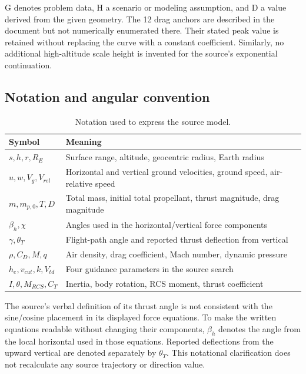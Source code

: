 \documentclass[11pt,a4paper]{article}
\begin{document}


G denotes problem data, H a scenario or modeling assumption, and D a value derived from the given geometry. The 12 drag anchors are described in the document but not numerically enumerated there. Their stated peak value is retained without replacing the curve with a constant coefficient. Similarly, no additional high-altitude scale height is invented for the source's exponential continuation.

\subsection{Notation and angular convention}
\begin{table}[htbp]
\caption{Notation used to express the source model.}
\label{tab:notation}
\small
\begin{tabularx}{\linewidth}{@{}lX@{}}
\toprule
Symbol & Meaning\\
\midrule
$s,h,r,R_E$ & Surface range, altitude, geocentric radius, Earth radius\\
$u,w,V_g,V_{rel}$ & Horizontal and vertical ground velocities, ground speed, air-relative speed\\
$m,m_{p,0},T,D$ & Total mass, initial total propellant, thrust magnitude, drag magnitude\\
$\beta_h,\chi$ & Angles used in the horizontal/vertical force components\\
$\gamma,\theta_T$ & Flight-path angle and reported thrust deflection from vertical\\
$\rho,C_D,M,q$ & Air density, drag coefficient, Mach number, dynamic pressure\\
$h_e,v_{cut},k,V_{td}$ & Four guidance parameters in the source search\\
$I,\theta,M_{RCS},C_T$ & Inertia, body rotation, RCS moment, thrust coefficient\\
\bottomrule
\end{tabularx}
\end{table}

The source's verbal definition of its thrust angle is not consistent with the sine/cosine placement in its displayed force equations. To make the written equations readable without changing their components, $\beta_h$ denotes the angle from the local horizontal used in those equations. Reported deflections from the upward vertical are denoted separately by $\theta_T$. This notational clarification does not recalculate any source trajectory or direction value.
\end{document}
